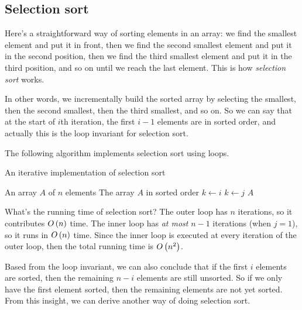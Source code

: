 \subsection{Selection sort}
Here's a straightforward way of sorting elements in an array: we find the smallest element and put it in front, then we find the second smallest element and put it in the second position, then we find the third smallest element and put it in the third position, and so on until we reach the last element. This is how \textit{selection sort} works.

In other words, we incrementally build the sorted array by selecting the smallest, then the second smallest, then the third smallest, and so on. So we can say that at the start of $i$th iteration, the first $i-1$ elements are in sorted order, and actually this is the loop invariant for selection sort.

The following algorithm implements selection sort using loops.

\begin{algorithm}[H]
    \caption{An iterative implementation of selection sort}
    \begin{algorithmic}[1]
        \Require An array $A$ of $n$ elements
        \Ensure The array $A$ in sorted order
            \State $k \gets i$
                    \State $k \gets j$
                \EndIf
            \EndFor
            \State {}
        \EndFor
        \Return $A$
        \EndFunction
    \end{algorithmic}
\end{algorithm}

What's the running time of selection sort? The outer loop has $n$ iterations, so it contributes $O\left(n \right)$ time. The inner loop has \textit{at most} $n-1$ iterations (when $j=1$), so it runs in $O\left(n \right)$ time. Since the inner loop is executed at every iteration of the outer loop, then the total running time is $O\left(n^2 \right)$.

Based from the loop invariant, we can also conclude that if the first $i$ elements are sorted, then the remaining $n-i$ elements are still unsorted. So if we only have the first element sorted, then the remaining elements are not yet sorted. From this insight, we can derive another way of doing selection sort. 

